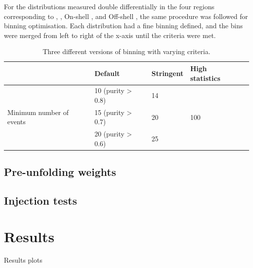 For the distributions measured double differentially in the four \mFourL regions corresponding to \Z, \Higgs, On-shell \ZZ, and Off-shell \ZZ, the same procedure was followed for binning optimisation. Each distribution had a fine binning defined, and the bins were merged from left to right of the x-axis until the criteria were met. 

\begin{table}[bp]
  \begin{tabular}{lllll}
                & Default              & Stringent              & High statistics             \\
    \midrule
                                & 10 (purity > 0.8)   & 14 &   \\
     Minimum number of events & 15 (purity > 0.7) & 20 & 100    \\
                                &20 (purity > 0.6) & 25 &    \\
  \end{tabular}
  \caption{Three different versions of binning with varying criteria.}
  \label{tab:BinningVersions}
\end{table}

\subsection{Pre-unfolding weights}
\label{subsec:preuf}



\subsection{Injection tests}
\label{subsec:injection}


\section{Results}
\label{sec:results}

Results plots